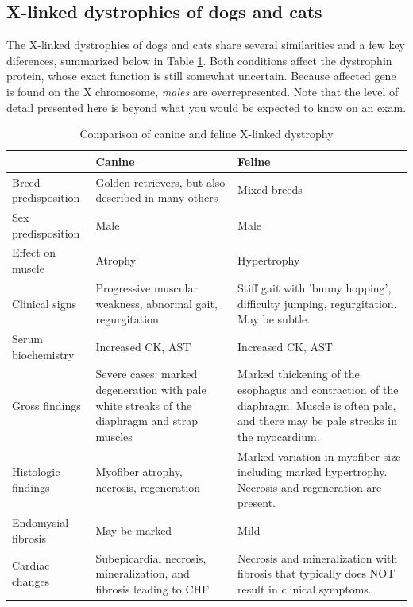 \documentclass[openany]{report}
\begin{document}
\subsection{X-linked dystrophies of dogs and
cats}\label{x-linked-dystrophies-of-dogs-and-cats}

The X-linked dystrophies of dogs and cats share several similarities and
a few key diferences, summarized below in Table
\ref{tab:dystrophy-table}. Both conditions affect the dystrophin
protein, whose exact function is still somewhat uncertain. Because
affected gene is found on the X chromosome, \emph{males} are
overrepresented. Note that the level of detail presented here is beyond
what you would be expected to know on an exam.

\begin{table}[t]

\caption{\label{tab:dystrophy-table}Comparison of canine and feline X-linked dystrophy}
\centering
\begin{tabular}{l>{\raggedright\arraybackslash}p{15em}>{\raggedright\arraybackslash}p{15em}}
\toprule
  & Canine & Feline\\
\midrule
Breed predisposition & Golden retrievers, but also described in many others & Mixed breeds\\
Sex predisposition & Male & Male\\
Effect on muscle & Atrophy & Hypertrophy\\
Clinical signs & Progressive muscular weakness, abnormal gait, regurgitation & Stiff gait with 'bunny hopping', difficulty jumping, regurgitation. May be subtle.\\
Serum biochemistry & Increased CK, AST & Increased CK, AST\\
\addlinespace
Gross findings & Severe cases: marked degeneration with pale white streaks of the diaphragm and strap muscles & Marked thickening of the esophagus and contraction of the diaphragm. Muscle is often pale, and there may be pale streaks in the myocardium.\\
Histologic findings & Myofiber atrophy, necrosis, regeneration & Marked variation in myofiber size including marked hypertrophy. Necrosis and regeneration are present.\\
Endomysial fibrosis & May be marked & Mild\\
Cardiac changes & Subepicardial necrosis, mineralization, and fibrosis leading to CHF & Necrosis and mineralization with fibrosis that typically does NOT result in clinical symptoms.\\
\bottomrule
\end{tabular}
\end{table}
\end{document}
